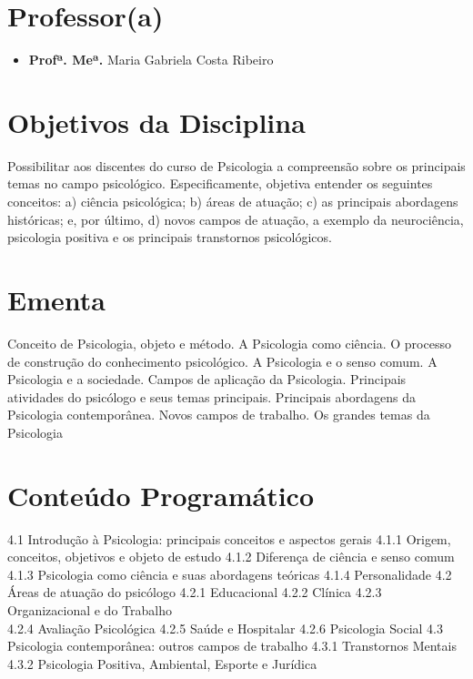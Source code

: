 \documentclass[
]{book}
\providecommand{\tightlist}{%
  \setlength{\itemsep}{0pt}\setlength{\parskip}{0pt}}
\begin{document}
\hypertarget{professora}{%
\section{Professor(a)}\label{professora}}

\begin{itemize}
\tightlist
\item
  \textbf{Profª. Meª.} Maria Gabriela Costa Ribeiro
\end{itemize}

\hypertarget{objetivos-da-disciplina}{%
\section{Objetivos da Disciplina}\label{objetivos-da-disciplina}}

Possibilitar aos discentes do curso de Psicologia a compreensão sobre os principais temas no campo psicológico. Especificamente, objetiva entender os seguintes conceitos: a) ciência psicológica; b) áreas de atuação; c) as principais abordagens históricas; e, por último, d) novos campos de atuação, a exemplo da neurociência, psicologia positiva e os principais transtornos psicológicos.

\hypertarget{ementa}{%
\section{Ementa}\label{ementa}}

Conceito de Psicologia, objeto e método. A Psicologia como ciência. O processo de construção do conhecimento psicológico. A Psicologia e o senso comum. A Psicologia e a sociedade. Campos de aplicação da Psicologia. Principais atividades do psicólogo e seus temas principais. Principais abordagens da Psicologia contemporânea. Novos campos de trabalho. Os grandes temas da Psicologia

\hypertarget{conteuxfado-programuxe1tico}{%
\section{Conteúdo Programático}\label{conteuxfado-programuxe1tico}}

4.1 Introdução à Psicologia: principais conceitos e aspectos gerais
4.1.1 Origem, conceitos, objetivos e objeto de estudo
4.1.2 Diferença de ciência e senso comum
4.1.3 Psicologia como ciência e suas abordagens teóricas
4.1.4 Personalidade
4.2 Áreas de atuação do psicólogo
4.2.1 Educacional
4.2.2 Clínica
4.2.3 Organizacional e do Trabalho\\
4.2.4 Avaliação Psicológica
4.2.5 Saúde e Hospitalar
4.2.6 Psicologia Social
4.3 Psicologia contemporânea: outros campos de trabalho
4.3.1 Transtornos Mentais
4.3.2 Psicologia Positiva, Ambiental, Esporte e Jurídica
\end{document}
